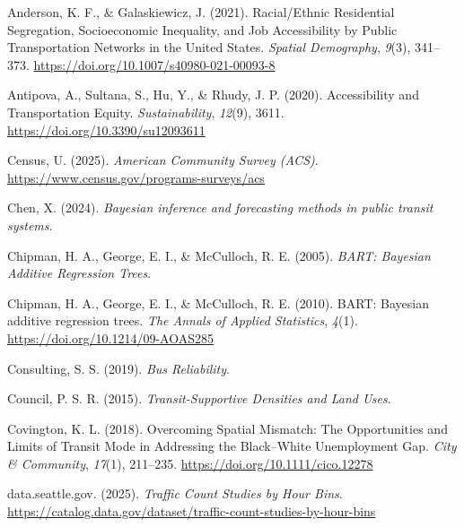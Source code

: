 \documentclass[
  12pt,
]{article}
\newlength{\cslhangindent}
\newenvironment{CSLReferences}[2] %
 {\begin{list}{}{%
  \setlength{\itemindent}{0pt}
  \setlength{\leftmargin}{0pt}
  \setlength{\parsep}{0pt}
  \ifodd #1
   \setlength{\leftmargin}{\cslhangindent}
   \setlength{\itemindent}{-1\cslhangindent}
  \fi
  \setlength{\itemsep}{#2\baselineskip}}}
 {\end{list}}
\begin{document}
\label{refs}
\begin{CSLReferences}{1}{0}
Anderson, K. F., \& Galaskiewicz, J. (2021). Racial/{Ethnic}
{Residential} {Segregation}, {Socioeconomic} {Inequality}, and {Job}
{Accessibility} by {Public} {Transportation} {Networks} in the {United}
{States}. \emph{Spatial Demography}, \emph{9}(3), 341--373.
\url{https://doi.org/10.1007/s40980-021-00093-8}

Antipova, A., Sultana, S., Hu, Y., \& Rhudy, J. P. (2020). Accessibility
and {Transportation} {Equity}. \emph{Sustainability}, \emph{12}(9),
3611. \url{https://doi.org/10.3390/su12093611}

Census, U. (2025). \emph{American {Community} {Survey} ({ACS})}.
\url{https://www.census.gov/programs-surveys/acs}

Chen, X. (2024). \emph{Bayesian inference and forecasting methods in
public transit systems}.

Chipman, H. A., George, E. I., \& McCulloch, R. E. (2005). \emph{{BART}:
{Bayesian} {Additive} {Regression} {Trees}}.

Chipman, H. A., George, E. I., \& McCulloch, R. E. (2010). {BART}:
{Bayesian} additive regression trees. \emph{The Annals of Applied
Statistics}, \emph{4}(1). \url{https://doi.org/10.1214/09-AOAS285}

Consulting, S. S. (2019). \emph{Bus {Reliability}}.

Council, P. S. R. (2015). \emph{Transit-{Supportive} {Densities} and
{Land} {Uses}}.

Covington, K. L. (2018). Overcoming {Spatial} {Mismatch}: {The}
{Opportunities} and {Limits} of {Transit} {Mode} in {Addressing} the
{Black}--{White} {Unemployment} {Gap}. \emph{City \& Community},
\emph{17}(1), 211--235. \url{https://doi.org/10.1111/cico.12278}

data.seattle.gov. (2025). \emph{Traffic {Count} {Studies} by {Hour}
{Bins}}.
\url{https://catalog.data.gov/dataset/traffic-count-studies-by-hour-bins}


\end{CSLReferences}
\end{document}
